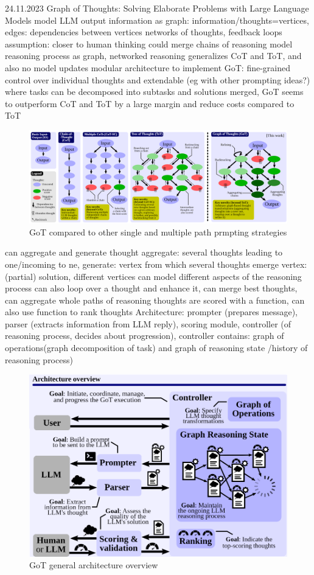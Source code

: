 \documentclass{article}
\begin{document}
\cite{besta_graph_2023} 24.11.2023 Graph of Thoughts: Solving Elaborate Problems with Large Language Models
model LLM output information as graph:
information/thoughts=vertices, edges: dependencies between vertices
networks of thoughts, feedback loops
assumption: closer to human thinking
could merge chains of reasoning
model reasoning process as graph, networked reasoning
generalizes CoT and ToT, and also no model updates
modular architecture to implement GoT:
fine-grained control over individual thoughts and extendable (eg with other prompting ideas?)
where tasks can be decomposed into subtasks and solutions merged, GoT seems to outperform CoT and ToT by a large margin and reduce costs compared to ToT
\begin{figure}[h]
	\centering
	\includegraphics[width=0.7\linewidth]{GoT-Comparison.png}
	\caption{\cite{besta_graph_2023}  GoT compared to other single and multiple path prmpting strategies}
	\label{fig:got-comparison}
\end{figure}
can aggregate and generate thought aggregate: several thoughts leading to one/incoming to ne, generate: vertex from which several thoughts emerge
vertex: (partial) solution, different vertices can model different aspects of the reasoning process
can also loop over a thought and enhance it, can merge best thoughts, can aggregate whole paths of reasoning
thoughts are scored with a function, can also use function to rank thoughts
Architecture: prompter (prepares message), parser (extracts information from LLM reply), scoring module, controller (of reasoning process, decides about progression), controller contains: graph of operations(graph decomposition of task) and graph of reasoning state /history of reasoning process)
\begin{figure}[h]
	\centering
	\includegraphics[width=0.7\linewidth]{GoT-Architecture.png}
	\caption{\cite{besta_graph_2023}  GoT general architecture overview}
	\label{fig:got-comparison}
\end{figure}
\end{document}
